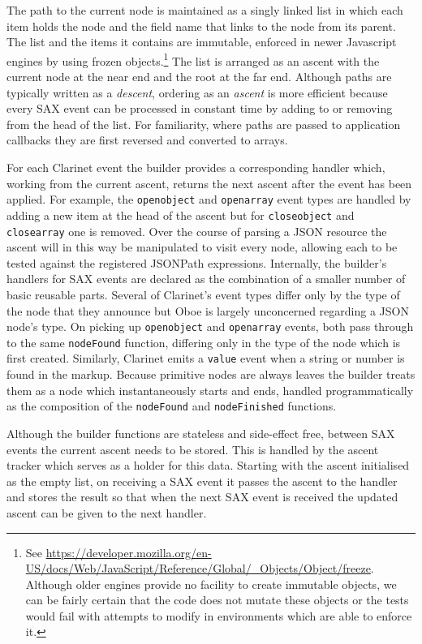 \documentclass[12pt, ]{article}
\begin{document}
The path to the current node is maintained as a singly linked list in
which each item holds the node and the field name that links to the node
from its parent. The list and the items it contains are immutable,
enforced in newer Javascript engines by using frozen objects.\footnote{See
  \url{https://developer.mozilla.org/en-US/docs/Web/JavaScript/Reference/Global/_Objects/Object/freeze}.
  Although older engines provide no facility to create immutable
  objects, we can be fairly certain that the code does not mutate these
  objects or the tests would fail with attempts to modify in
  environments which are able to enforce it.} The list is arranged as an
ascent with the current node at the near end and the root at the far
end. Although paths are typically written as a \emph{descent}, ordering
as an \emph{ascent} is more efficient because every SAX event can be
processed in constant time by adding to or removing from the head of the
list. For familiarity, where paths are passed to application callbacks
they are first reversed and converted to arrays.

For each Clarinet event the builder provides a corresponding handler
which, working from the current ascent, returns the next ascent after
the event has been applied. For example, the \texttt{openobject} and
\texttt{openarray} event types are handled by adding a new item at the
head of the ascent but for \texttt{closeobject} and \texttt{closearray}
one is removed. Over the course of parsing a JSON resource the ascent
will in this way be manipulated to visit every node, allowing each to be
tested against the registered JSONPath expressions. Internally, the
builder's handlers for SAX events are declared as the combination of a
smaller number of basic reusable parts. Several of Clarinet's event
types differ only by the type of the node that they announce but Oboe is
largely unconcerned regarding a JSON node's type. On picking up
\texttt{openobject} and \texttt{openarray} events, both pass through to
the same \texttt{nodeFound} function, differing only in the type of the
node which is first created. Similarly, Clarinet emits a \texttt{value}
event when a string or number is found in the markup. Because primitive
nodes are always leaves the builder treats them as a node which
instantaneously starts and ends, handled programmatically as the
composition of the \texttt{nodeFound} and \texttt{nodeFinished}
functions.

Although the builder functions are stateless and side-effect free,
between SAX events the current ascent needs to be stored. This is
handled by the ascent tracker which serves as a holder for this data.
Starting with the ascent initialised as the empty list, on receiving a
SAX event it passes the ascent to the handler and stores the result so
that when the next SAX event is received the updated ascent can be given
to the next handler.
\end{document}
